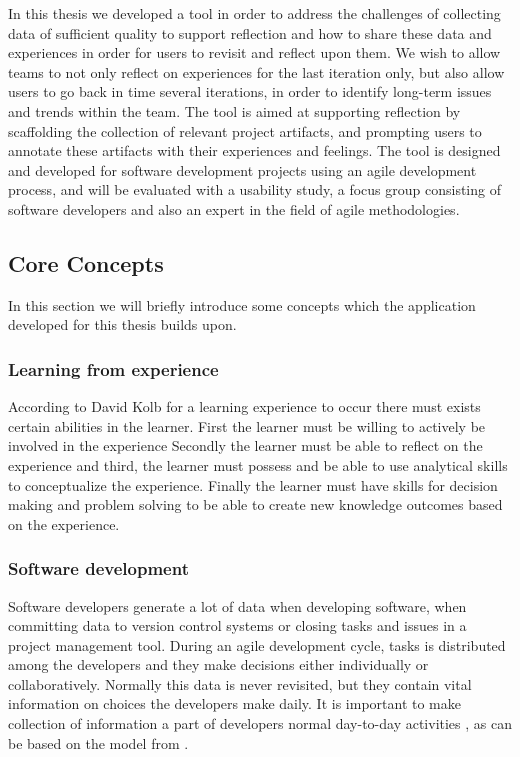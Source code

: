 In this thesis we developed a tool in order to address the challenges of collecting data of sufficient quality to support reflection and how to share these data and experiences in order for users to revisit and reflect upon them. We wish to allow teams to not only reflect on experiences for the last iteration only, but also allow users to go back in time several iterations, in order to identify long-term issues and trends within the team. The tool is aimed at supporting reflection by scaffolding the collection of relevant project artifacts, and prompting users to annotate these artifacts with their experiences and feelings. The tool is designed and developed for software development projects using an agile development process, and will be evaluated with a usability study, a focus group consisting of software developers and also an expert in the field of agile methodologies. 

\subsection{Core Concepts}
In this section we will briefly introduce some concepts which the application developed for this thesis builds upon.
\subsubsection{Learning from experience}
According to David Kolb\citep{KolbModel} for a learning experience to occur there must exists certain abilities in the learner. First the learner must be willing to actively be involved in the experience Secondly the learner must be able to reflect on the experience and third, the learner must possess and be able to use analytical skills to conceptualize the experience. Finally the learner must have skills for decision making and problem solving to be able to create new knowledge outcomes based on the experience.

\subsubsection{Software development}
Software developers generate a lot of data when developing software, when committing data to version control systems or closing tasks and issues in a project management tool. During an agile development cycle, tasks is distributed among the developers and they make decisions either individually or collaboratively. Normally this data is never revisited, but they contain vital information on choices the developers make daily. It is important to make collection of information a part of developers normal day-to-day activities , as can be based on the model from \citep{Krogstie2009}.

